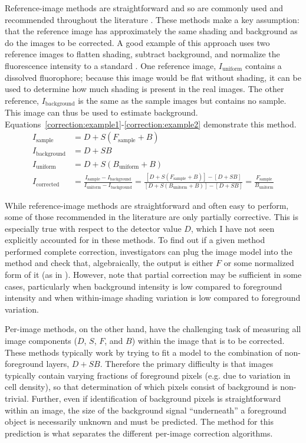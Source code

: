 Reference-image methods are straightforward and so are commonly used and 
recommended throughout the literature
\cite{VandenDoel1998,Model2001,Zwier2004,Wolf2007,Waters2009}.
These methods make a key assumption: that the reference image 
has approximately the same shading and background
as do the images to be corrected. A good example of this approach
uses two reference images to flatten shading, subtract background,
and normalize the fluorescence
intensity to a standard \cite{Model2001}.
One reference image, $I_\text{uniform}$ contains a
dissolved fluorophore; because this image would be flat without shading, it can
be used to determine how much shading is present in the real images. The other
reference, $I_\text{background}$ is the same as the sample images but contains no
sample. This image can thus be used to estimate background.
Equations~\ref{correction:example1}\nobreakdash-\ref{correction:example2} demonstrate this method.
	\begin{align}
	I_\text{sample}     &= D+S(F_\text{sample}+B) \label{correction:example1}\\
	I_\text{background} &= D+SB \label{correction:ib} \\
	I_\text{uniform}    &= D+S(B_\text{uniform}+B) \\
	I_\text{corrected}  &= \frac{ I_\text{sample}-I_\text{background} }{ I_\text{uniform}-I_\text{background} }
		= \frac{ [D+S(F_\text{sample}+B)]-[D+SB]}{ [D+S(B_\text{uniform}+B)]-[D+SB] }
		= \frac{F_\text{sample}}{B_\text{uniform}} \label{correction:example2}
	\end{align}
	


While reference-image methods are straightforward and often easy to perform,
some of those recommended in the literature are only partially corrective. This is especially
true with respect to the detector value $D$, which
I have not seen explicitly accounted for in these methods.
To find out if a given method performed complete correction, investigators can plug the
image model into the method and check that, algebraically, the output is either
$F$ or some normalized form of it (as in ).
However, note that partial correction may be
sufficient in some cases, particularly when background intensity is low compared
to foreground intensity and when within-image shading variation
is low compared to foreground variation.


Per-image methods, on the other hand, have the challenging task of measuring
all image components ($D$, $S$, $F$, and $B$)
within the image that is to be corrected. These methods typically
work by trying to fit a model to the combination of non-foreground
layers, $D+SB$. Therefore the primary difficulty
is that images typically contain varying fractions of foreground pixels
(e.g. due to variation in cell density),
so that determination of which pixels consist of background
is non-trivial. Further, even if identification of background pixels
is straightforward within an image, the size of the background signal
``underneath'' a foreground object is necessarily unknown and must
be predicted. The method for this prediction is what separates the different
per-image correction algorithms. 


